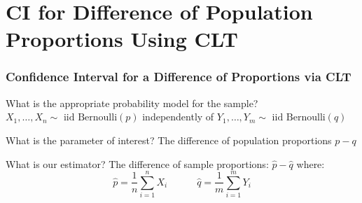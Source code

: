 \section{CI for Difference of Population Proportions Using CLT}
\begin{frame}
\frametitle{Confidence Interval for a Difference of Proportions via CLT}
	\begin{block}{What is the appropriate probability model for the sample?} 
$X_1, \hdots, X_n \sim \mbox{ iid Bernoulli}(p)$ independently  of $Y_1, \hdots, Y_m \sim \mbox{ iid Bernoulli}(q)$
\end{block}
	\begin{block}{What is the parameter of interest?}
The difference of population proportions $p - q$
\end{block}

\begin{block}{What is our estimator?}
The difference of sample proportions: $\widehat{p} - \widehat{q}$ where:
	$$\widehat{p} = \frac{1}{n}\sum_{i=1}^n X_i \quad \quad \quad	\widehat{q} = \frac{1}{m}\sum_{i=1}^m Y_i$$
\end{block}
\end{frame}



